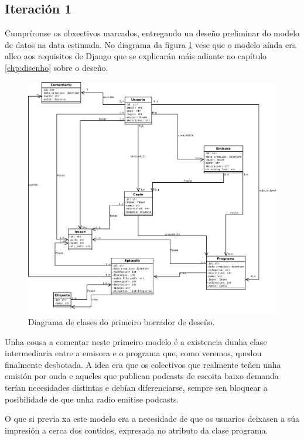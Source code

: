 \subsection{Iteración 1}

Cumpríronse os obxectivos marcados, entregando un deseño preliminar do modelo de datos na data estimada. No diagrama da figura \ref{fig:classold} vese que o modelo aínda era alleo aos requisitos de Django que se explicarán máis adiante no capítulo \ref{chp:disenho} sobre o deseño.

\begin{figure}[h]
	\centering
	\includegraphics[scale=0.35,keepaspectratio=true]{./images/class_diagram_20171107.png}
	\caption{Diagrama de clases do primeiro borrador de deseño.}
	\label{fig:classold}
\end{figure}

Unha cousa a comentar neste primeiro modelo é a existencia dunha clase  intermediaria entre a emisora e o programa que, como veremos, quedou finalmente desbotada. A idea era que os colectivos que realmente teñen unha emisión por onda e aqueles que publican podcasts de escoita baixo demanda terían necesidades distintas e debían diferenciarse, sempre sen bloquear a posibilidade de que unha radio emitise podcasts.

O que si previa xa este modelo era a necesidade de que os usuarios deixasen a súa impresión a cerca dos contidos, expresada no atributo  da clase programa. 

